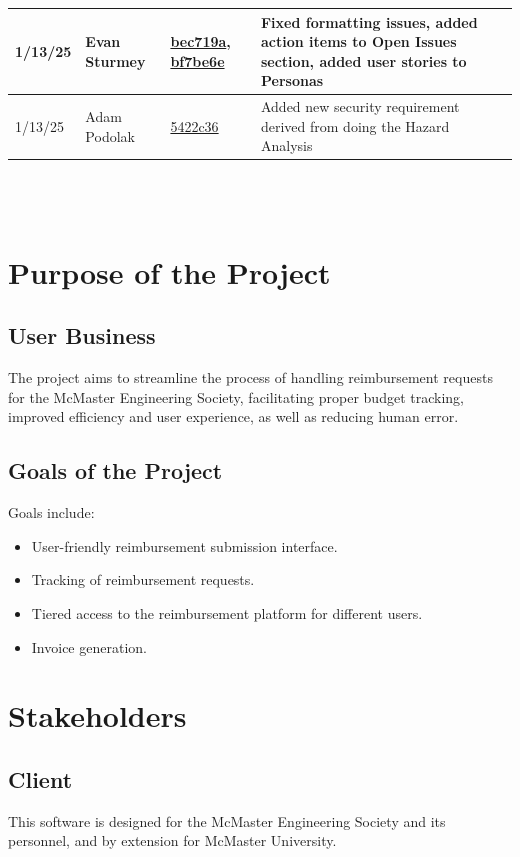 \documentclass[12pt]{article}
\begin{document}
\begin{table}[H]
\begin{tabularx}{\textwidth}{p{} p{} p{} p{}}
\midrule
1/13/25 & 
Evan Sturmey & 
\href{https://github.com/ausbennett/mes-finance-platform/commit/bec719a678c2e216e68564fe8e70e5d8c9853035}{bec719a},
\href{https://github.com/ausbennett/mes-finance-platform/commit/bf7be6e379e0efa3128f5f5989a94023b1278a87}{bf7be6e} & 
Fixed formatting issues, added action items to Open Issues section, added user stories to Personas\\
\midrule
1/13/25 & Adam Podolak & \href{https://github.com/ausbennett/mes-finance-platform/commit/5422c362a85ad7f0be7c1a9e8eb7d380189c7e6c}{5422c36} & Added new security requirement derived from doing the Hazard Analysis\\

\bottomrule
\end{tabularx}
\end{table}

~\\

~\newpage
\section{Purpose of the Project}
\subsection{User Business}
The project aims to streamline the process of handling reimbursement requests for the McMaster Engineering Society, facilitating proper budget tracking, improved efficiency and user experience, as well as reducing human error.

\subsection{Goals of the Project}
Goals include:
\begin{itemize}
    \item User-friendly reimbursement submission interface.
    \item Tracking of reimbursement requests.
    \item Tiered access to the reimbursement platform for different users.
    \item Invoice generation.
\end{itemize}

\section{Stakeholders}
\subsection{Client}
This software is designed for the McMaster Engineering Society and its personnel, and by extension for McMaster University.
\end{document}
